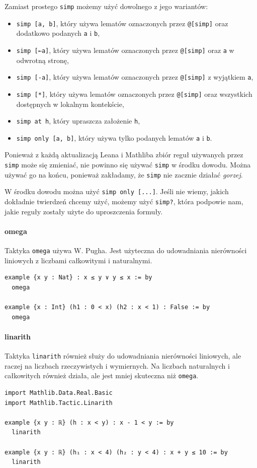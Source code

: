 \documentclass[polish,pretty,bibliography=totocnumbered]{angav}
\newcommand{\Lean}[1]{\texttt{#1}}
\begin{document}
Zamiast prostego \Lean{simp} możemy użyć dowolnego z jego wariantów:
\begin{itemize}[nosep]
    \item \Lean{simp [a, b]}, który używa lematów oznaczonych przez \Lean{@[simp]} oraz dodatkowo podanych \Lean{a} i \Lean{b},
    \item \Lean{simp [←a]}, który używa lematów oznaczonych przez \Lean{@[simp]} oraz \Lean{a} w odwrotną stronę,
    \item \Lean{simp [-a]}, który używa lematów oznaczonych przez \Lean{@[simp]} z wyjątkiem \Lean{a},
    \item \Lean{simp [*]}, który używa lematów oznaczonych przez \Lean{@[simp]} oraz wszystkich dostępnych w lokalnym kontekście,
    \item \Lean{simp at h}, który upraszcza założenie \Lean{h},
    \item \Lean{simp only [a, b]}, który używa tylko podanych lematów \Lean{a} i \Lean{b}.
\end{itemize}

\begin{remark}
    Ponieważ z każdą aktualizacją Leana i Mathliba zbiór reguł używanych przez \Lean{simp} może się zmieniać, nie powinno się używać \Lean{simp} w środku dowodu. Można używać go na końcu, ponieważ zakładamy, że \Lean{simp} nie zacznie działać \emph{gorzej}.

    W środku dowodu można użyć \Lean{simp only [...]}. Jeśli nie wiemy, jakich dokładnie twierdzeń chcemy użyć, możemy użyć \Lean{simp?}, która podpowie nam, jakie reguły zostały użyte do uproszczenia formuły.
\end{remark}

\paragraph{omega}
Taktyka \Lean{omega} używa  W. Pugha. Jest użyteczna do udowadniania nierówności liniowych z liczbami całkowitymi i naturalnymi.
\begin{verbatim}
example {x y : Nat} : x ≤ y ∨ y ≤ x := by
  omega

example {x : Int} (h1 : 0 < x) (h2 : x < 1) : False := by
  omega
\end{verbatim}

\paragraph{linarith}
Taktyka \Lean{linarith} również służy do udowadniania nierówności liniowych, ale raczej na liczbach rzeczywistych i wymiernych. Na liczbach naturalnych i całkowitych również działa, ale jest mniej skuteczna niż \Lean{omega}.
\begin{verbatim}
import Mathlib.Data.Real.Basic
import Mathlib.Tactic.Linarith

example {x y : ℝ} (h : x < y) : x - 1 < y := by
  linarith

example {x y : ℝ} (h₁ : x < 4) (h₂ : y < 4) : x + y ≤ 10 := by
  linarith
\end{verbatim}
\end{document}
